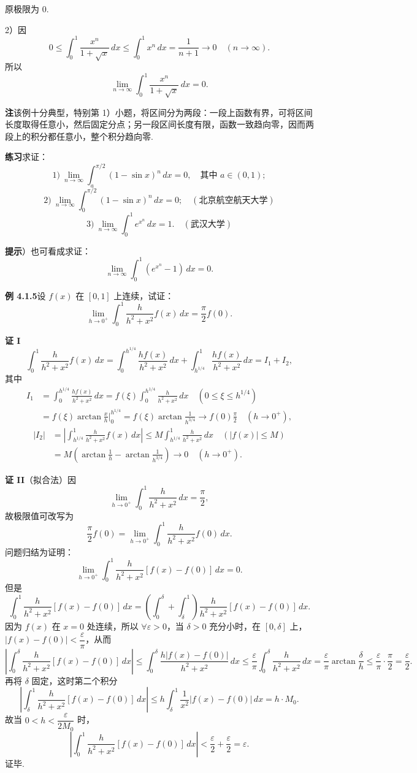 \documentclass[UTF8,12pt,a4paper,fontset=fandol]{ctexart}
\begin{document}
原极限为 $0$.

2）因
\[
0\le\int_0^1\frac{x^n}{1+\sqrt{x}}\,dx
\le\int_0^1x^n\,dx=\frac1{n+1}\to0\quad(n\to\infty).
\]
所以
\[
\lim_{n\to\infty}\int_0^1\frac{x^n}{1+\sqrt{x}}\,dx=0.
\]

\noindent\textbf{注}\quad 该例十分典型，特别第 1）小题，将区间分为两段：一段上函数有界，可将区间长度取得任意小，然后固定分点；另一段区间长度有限，函数一致趋向零，因而两段上的积分都任意小，整个积分趋向零.

\noindent\textbf{练习}\quad 求证：
\[
1)\ \lim_{n\to\infty}\int_a^{\pi/2}(1-\sin x)^n\,dx=0,\quad \text{其中 }a\in(0,1);
\]
\[
2)\ \lim_{n\to\infty}\int_0^{\pi/2}(1-\sin x)^n\,dx=0;\quad(\text{北京航空航天大学})
\]
\[
3)\ \lim_{n\to\infty}\int_0^1 e^{x^n}\,dx=1.\quad(\text{武汉大学})
\]

\noindent\textbf{提示}）也可看成求证：
\[
\lim_{n\to\infty}\int_0^1(e^{x^n}-1)\,dx=0.
\]

\noindent\textbf{例 4.1.5}\quad 设 $f(x)$ 在 $[0,1]$ 上连续，试证：
\[
\lim_{h\to0^+}\int_0^1\frac{h}{h^2+x^2}f(x)\,dx
=\frac\pi2 f(0).
\]

\noindent\textbf{证 I}\quad
\[
\int_0^1\frac{h}{h^2+x^2}f(x)\,dx
=\int_0^{h^{1/4}}\frac{hf(x)}{h^2+x^2}\,dx
+\int_{h^{1/4}}^1\frac{hf(x)}{h^2+x^2}\,dx=I_1+I_2,
\]
其中
\[
\begin{aligned}
I_1&=\int_0^{h^{1/4}}\frac{hf(x)}{h^2+x^2}\,dx
=f(\xi)\int_0^{h^{1/4}}\frac{h}{h^2+x^2}\,dx\quad(0\le\xi\le h^{1/4})\\
&=f(\xi)\arctan\frac{x}{h}\bigg|_0^{h^{1/4}}
=f(\xi)\arctan\frac1{h^{3/4}}\to f(0)\frac\pi2
\quad(h\to0^+),
\end{aligned}
\]
\[
\begin{aligned}
|I_2|
&=\left|\int_{h^{1/4}}^1\frac{h}{h^2+x^2}f(x)\,dx\right|
\le M\int_{h^{1/4}}^1\frac{h}{h^2+x^2}\,dx\quad(|f(x)|\le M)\\
&=M\left(\arctan\frac1h-\arctan\frac1{h^{3/4}}\right)\to0
\quad(h\to0^+).
\end{aligned}
\]

\noindent\textbf{证 II}\quad （拟合法）因
\[
\lim_{h\to0^+}\int_0^1\frac{h}{h^2+x^2}\,dx=\frac\pi2,
\]
故极限值可改写为
\[
\frac\pi2f(0)=\lim_{h\to0^+}\int_0^1\frac{h}{h^2+x^2}f(0)\,dx.
\]
问题归结为证明：
\[
\lim_{h\to0^+}\int_0^1
\frac{h}{h^2+x^2}\left[f(x)-f(0)\right]\,dx=0.
\]
但是
\[
\int_0^1\frac{h}{h^2+x^2}[f(x)-f(0)]\,dx
=\left(\int_0^\delta+\int_\delta^1\right)
\frac{h}{h^2+x^2}[f(x)-f(0)]\,dx.
\]
因为 $f(x)$ 在 $x=0$ 处连续，所以 $\forall\varepsilon>0$，当 $\delta>0$ 充分小时，在 $[0,\delta]$ 上，
$|f(x)-f(0)|<\dfrac\varepsilon\pi$，从而
\[
\left|\int_0^\delta\frac{h}{h^2+x^2}[f(x)-f(0)]\,dx\right|
\le\int_0^\delta\frac{h|f(x)-f(0)|}{h^2+x^2}\,dx
\le\frac\varepsilon\pi\int_0^\delta\frac{h}{h^2+x^2}\,dx
=\frac\varepsilon\pi\arctan\frac\delta h\le\frac\varepsilon\pi\cdot\frac\pi2=\frac\varepsilon2.
\]
再将 $\delta$ 固定，这时第二个积分
\[
\left|\int_\delta^1\frac{h}{h^2+x^2}[f(x)-f(0)]\,dx\right|
\le h\int_\delta^1\frac1{x^2}|f(x)-f(0)|\,dx=h\cdot M_0.
\]
故当 $0<h<\dfrac{\varepsilon}{2M_0}$ 时，
\[
\left|\int_0^1\frac{h}{h^2+x^2}[f(x)-f(0)]\,dx\right|
<\frac\varepsilon2+\frac\varepsilon2=\varepsilon.
\]
证毕.
\end{document}
